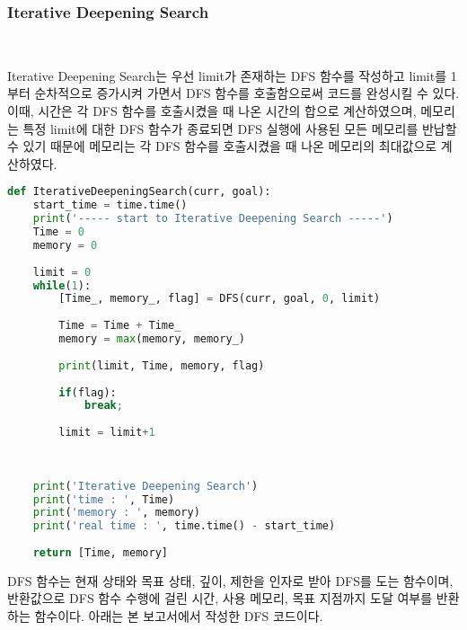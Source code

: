 \documentclass[manuscript,screen,review]{acmart}
\begin{document}
\subsubsection{Iterative Deepening Search}\

Iterative Deepening Search는 우선 limit가 존재하는 DFS 함수를 작성하고 limit를 1부터 순차적으로 증가시켜 가면서 DFS 함수를 호출함으로써 코드를 완성시킬 수 있다. 이때, 시간은 각 DFS 함수를 호출시켰을 때 나온 시간의 합으로 계산하였으며, 메모리는 특정 limit에 대한 DFS 함수가 종료되면 DFS 실행에 사용된 모든 메모리를 반납할 수 있기 때문에 메모리는 각 DFS 함수를 호출시켰을 때 나온 메모리의 최대값으로 계산하였다.

\begin{lstlisting}[language=python, caption=IterativeDeepeningSearch function] 
def IterativeDeepeningSearch(curr, goal):
    start_time = time.time()
    print('----- start to Iterative Deepening Search -----')
    Time = 0
    memory = 0
    
    limit = 0
    while(1):
        [Time_, memory_, flag] = DFS(curr, goal, 0, limit)
        
        Time = Time + Time_
        memory = max(memory, memory_)
        
        print(limit, Time, memory, flag)
        
        if(flag):
            break;
        
        limit = limit+1
        
    
                
    print('Iterative Deepening Search')
    print('time : ', Time)
    print('memory : ', memory)
    print('real time : ', time.time() - start_time)
    
    return [Time, memory]
\end{lstlisting}

DFS 함수는 현재 상태와 목표 상태, 깊이, 제한을 인자로 받아 DFS를 도는 함수이며, 반환값으로 DFS 함수 수행에 걸린 시간, 사용 메모리, 목표 지점까지 도달 여부를 반환하는 함수이다. 아래는 본 보고서에서 작성한 DFS 코드이다.
\end{document}
